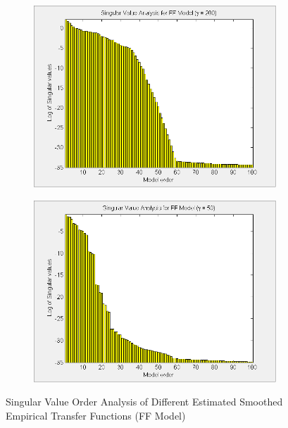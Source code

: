 \begin{landscape}
\begin{figure}[H]
\begin{subfigure}[b]{0.38\textwidth}
\label{pic:}
\end{subfigure}\;\begin{subfigure}[b]{0.38\textwidth}
\includegraphics[width=1.0\textwidth]{pics/SVD_FF_200}

\label{pic:}
\end{subfigure}\;\begin{subfigure}[b]{0.38\textwidth}
\includegraphics[width=1.0\textwidth]{pics/SVD_FF_50}

\label{pic:}
\end{subfigure}
\caption{Singular Value Order Analysis of Different Estimated Smoothed Empirical Transfer Functions (FF Model)}
\end{figure}

\end{landscape}


